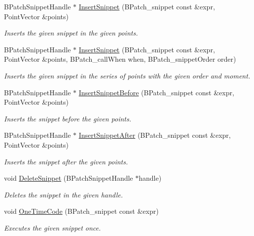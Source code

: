 \begin{DoxyCompactItemize}
B\-Patch\-Snippet\-Handle $\ast$ \hyperlink{class_di_process_a79ae7629dedcd84ab0776deaa166f7c4}{Insert\-Snippet} (B\-Patch\-\_\-snippet const \&expr, Point\-Vector \&points)
\begin{DoxyCompactList}\small\item\em Inserts the given snippet in the given points. \end{DoxyCompactList}\item 
B\-Patch\-Snippet\-Handle $\ast$ \hyperlink{class_di_process_a39c00229b7533befd6edb616ce9df787}{Insert\-Snippet} (B\-Patch\-\_\-snippet const \&expr, Point\-Vector \&points, B\-Patch\-\_\-call\-When when, B\-Patch\-\_\-snippet\-Order order)
\begin{DoxyCompactList}\small\item\em Inserts the given snippet in the series of points with the given order and moment. \end{DoxyCompactList}\item 
B\-Patch\-Snippet\-Handle $\ast$ \hyperlink{class_di_process_af6bcde05d9750fbba96e94da27116ac7}{Insert\-Snippet\-Before} (B\-Patch\-\_\-snippet const \&expr, Point\-Vector \&points)
\begin{DoxyCompactList}\small\item\em Inserts the snippet before the given points. \end{DoxyCompactList}\item 
B\-Patch\-Snippet\-Handle $\ast$ \hyperlink{class_di_process_a4efe5b0907efbcd8b95d681336e58a65}{Insert\-Snippet\-After} (B\-Patch\-\_\-snippet const \&expr, Point\-Vector \&points)
\begin{DoxyCompactList}\small\item\em Inserts the snippet after the given points. \end{DoxyCompactList}\item 
void \hyperlink{class_di_process_a1358a94954ae1ef6d3fbffafbd95b567}{Delete\-Snippet} (B\-Patch\-Snippet\-Handle $\ast$handle)
\begin{DoxyCompactList}\small\item\em Deletes the snippet in the given handle. \end{DoxyCompactList}\item 
void \hyperlink{class_di_process_aa83c0791594eddab08a1a0e5952c5e5a}{One\-Time\-Code} (B\-Patch\-\_\-snippet const \&expr)
\begin{DoxyCompactList}\small\item\em Executes the given snippet once. \end{DoxyCompactList}\item 

\end{DoxyCompactItemize}
